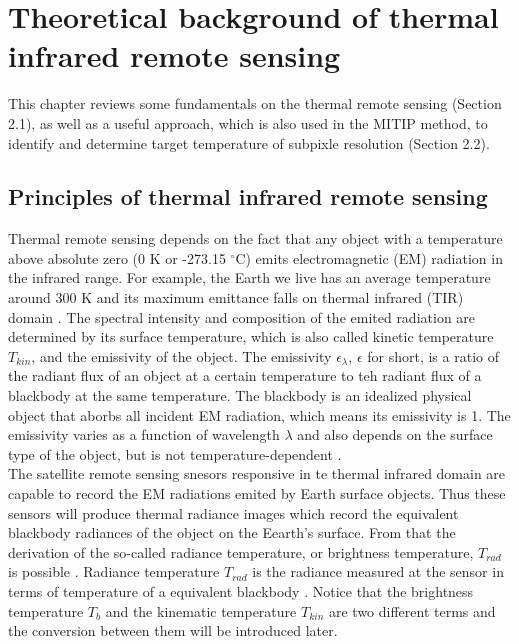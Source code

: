 \chapter{Theoretical background of thermal infrared remote sensing}

\label{Chapter2}

This chapter reviews some fundamentals on the thermal remote sensing (Section 2.1), as well as a useful approach, which is also used in the MITIP method, to identify and determine target temperature of subpixle resolution (Section 2.2). \\


\section{Principles of thermal infrared remote sensing}
Thermal remote sensing depends on the fact that any object with a temperature above absolute zero (0 K or -273.15 $^\circ$C) emits electromagnetic (EM) radiation in the infrared range. For example, the Earth we live has an average temperature around 300 K and its maximum emittance falls on thermal infrared (TIR) domain \parencite {Reference201}. The spectral intensity and composition of the emited radiation are determined by its surface temperature, which is also called kinetic temperature $T_{kin}$,  and the emissivity of the object. The emissivity $\epsilon_{\lambda}$, $\epsilon$ for short, is a ratio of the radiant flux of an object at a certain temperature to teh radiant flux of a blackbody at the same temperature. The blackbody is an idealized physical object that aborbs all incident EM radiation, which means its emissivity is 1. The emissivity varies as a function of wavelength $\lambda$ and also depends on the surface type of the object, but is not temperature-dependent \parencite{Reference202, Reference203}.\\

The satellite remote sensing snesors responsive in te thermal infrared domain are capable to record the EM radiations emited by Earth surface objects. Thus these sensors will produce thermal radiance images which record the equivalent blackbody radiances of the object on the Eearth's surface. From that the derivation of the so-called radiance temperature, or brightness temperature, $T_{rad}$ is possible \parencite{Reference204, Reference205}. Radiance temperature $T_{rad}$ is the radiance measured at the sensor in terms of temperature of a equivalent blackbody \parencite{Reference206}. Notice that the brightness temperature $T_b$ and the kinematic temperature $T_{kin}$ are two different terms and the conversion between them will be introduced later.

